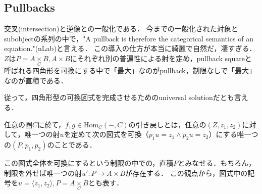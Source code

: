 \documentclass[uplatex, 12pt, dvipdfmx]{jsarticle}
\begin{document}
\subsection{Pullbacks}
交叉(intersection)と逆像との一般化である．
今までの一般化された対象とsubobjectの系列の中で，"A pullback is therefore the categorical semantics of an equation."(nLab)と言える．
この導入の仕方が本当に綺麗で自然だ，凄すぎる．$Z$は$P=A\underset{C}{\times}B,A\times B$にそれぞれ別の普遍性による射を定め，pullback squareと呼ばれる四角形を可換にする中で「最大」なのがpullback，制限なしで「最大」なのが直積である．
\begin{center}
\end{center}
従って，四角形型の可換図式を完成させるためのuniversal solutionだとも言える．

\begin{definition}[引き戻し]
    任意の圏$C$に於て，$f,g\in\mathrm{Hom}_C(-,C)$の引き戻しとは，任意の$(Z,z_1,z_2)$に対して，唯一つの射$u$を定めて次の図式を可換（$p_1u=z_1\land p_2u=z_2$）にする唯一つの$(P,p_1,p_2)$のことである．
    \begin{center}
    \end{center}
    この図式全体を可換にするという制限の中での，直積$P$とみなせる．もちろん，制限を外せば唯一つの射$u':P\to A\times B$が存在する．
    この観点から，図式中の記号を$u=\langle z_1,z_2\rangle, P=A\underset{C}{\times}B$とも表す．
\end{definition}
\end{document}

